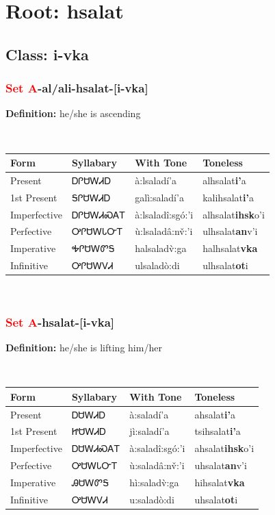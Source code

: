 \needspace{4in}
\section*{Root: hsalat}
\nopagebreak
{}
\needspace{3in}
\subsection*{Class: i-vka}
\nopagebreak
\needspace{2in}
\subsubsection*{\textcolor{Red}{Set A}{-}al/ali{-}\textbf{hsalat}{-}[i-vka]}
\nopagebreak
\textbf{Definition: } he/she is ascending
\\[0.5em]
\begin{tabularx}{\textwidth}{l X X X}%
\toprule%
\textbf{Form}&\textbf{Syllabary}&\textbf{With Tone}&\textbf{Toneless}\\%
\midrule%
Present&ᎠᎵᏌᎳᏗᎠ&à:lsaladí’a&alhsalat\textbf{i'}a\\%
1st Present&ᎦᎵᏌᎳᏗᎠ&galì:saladí’a&kalihsalat\textbf{i'}a\\%
Imperfective&ᎠᎵᏌᎳᏗᏍᎪᎢ&à:lsaladî:sgó:’i&alhsalat\textbf{ihsk}o'i\\%
Perfective&ᎤᎵᏌᎳᏓᏅᎢ&ù:lsaladâ:nv̌:’i&ulhsalat\textbf{an}v'i\\%
Imperative&ᎭᎵᏌᎳᏛᎦ&halsaladv̀:ga&halhsalat\textbf{vka}\\%
Infinitive&ᎤᎵᏌᎳᏙᏗ&ulsaladò:di&ulhsalat\textbf{ot}i\\%
\bottomrule%
\end{tabularx}
\\[1em]
\needspace{2in}
\subsubsection*{\textcolor{Red}{Set A}{-}\textbf{hsalat}{-}[i-vka]}
\nopagebreak
\textbf{Definition: } he/she is lifting him/her
\\[0.5em]
\begin{tabularx}{\textwidth}{l X X X}%
\toprule%
\textbf{Form}&\textbf{Syllabary}&\textbf{With Tone}&\textbf{Toneless}\\%
\midrule%
Present&ᎠᏌᎳᏗᎠ&à:saladí’a&ahsalat\textbf{i'}a\\%
1st Present&ᏥᏌᎳᏗᎠ&jì:saladí’a&tsihsalat\textbf{i'}a\\%
Imperfective&ᎠᏌᎳᏗᏍᎪᎢ&à:saladî:sgó:’i&ahsalat\textbf{ihsk}o'i\\%
Perfective&ᎤᏌᎳᏓᏅᎢ&ù:saladâ:nv̌:’i&uhsalat\textbf{an}v'i\\%
Imperative&ᎯᏌᎳᏛᎦ&hì:saladv̀:ga&hihsalat\textbf{vka}\\%
Infinitive&ᎤᏌᎳᏙᏗ&u:saladò:di&uhsalat\textbf{ot}i\\%
\bottomrule%
\end{tabularx}
\\[1em]